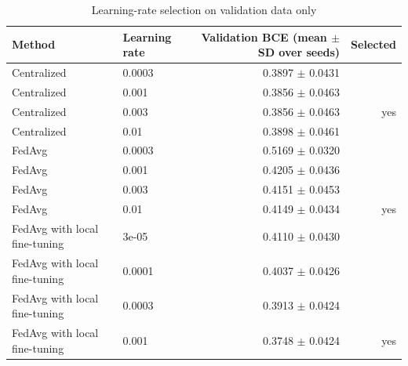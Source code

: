 \begin{table}[ht]
\centering
\small
\caption{Learning-rate selection on validation data only}
\label{tab:table4_model_selection}
\begin{tabular}{llrr}
\toprule
Method & Learning rate & Validation BCE (mean $\pm$ SD over seeds) & Selected \\
\midrule
Centralized & 0.0003 & 0.3897 $\pm$ 0.0431 &  \\
Centralized & 0.001 & 0.3856 $\pm$ 0.0463 &  \\
Centralized & 0.003 & 0.3856 $\pm$ 0.0463 & yes \\
Centralized & 0.01 & 0.3898 $\pm$ 0.0461 &  \\
FedAvg & 0.0003 & 0.5169 $\pm$ 0.0320 &  \\
FedAvg & 0.001 & 0.4205 $\pm$ 0.0436 &  \\
FedAvg & 0.003 & 0.4151 $\pm$ 0.0453 &  \\
FedAvg & 0.01 & 0.4149 $\pm$ 0.0434 & yes \\
FedAvg with local fine-tuning & 3e-05 & 0.4110 $\pm$ 0.0430 &  \\
FedAvg with local fine-tuning & 0.0001 & 0.4037 $\pm$ 0.0426 &  \\
FedAvg with local fine-tuning & 0.0003 & 0.3913 $\pm$ 0.0424 &  \\
FedAvg with local fine-tuning & 0.001 & 0.3748 $\pm$ 0.0424 & yes \\
\bottomrule
\end{tabular}
\end{table}
